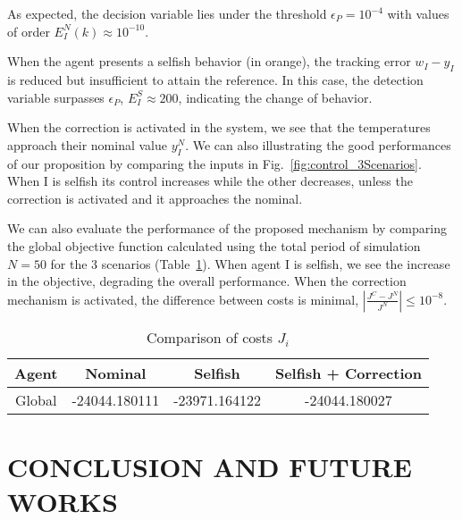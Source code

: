 \documentclass{ifacconf}  %
\begin{document}
As expected, the decision variable lies under the threshold $\epsilon_{P}=10^{-4}$ with values of order ${E_{I}^{N}(k)\approx10^{-10}}$.


When the agent presents a selfish behavior (in orange), the tracking error
${w_{I}-y_{I}}$ is reduced but insufficient to attain the reference.
In this case, the detection variable surpasses $\epsilon_{P}$,
${E_{I}^{S}\approx200}$, indicating the change of behavior.

When the correction is activated in the system, we see that the temperatures approach their nominal value $y_{I}^{N}$.
We can also illustrating the good
performances of our proposition by comparing the inputs in Fig.~\ref{fig:control_3Scenarios}. When I is selfish its control increases while the other decreases, unless the correction is activated and it approaches the nominal.

We can also evaluate the performance of the proposed mechanism by comparing the global objective function calculated using the total period of simulation ${N=50}$ for the 3 scenarios (Table~\ref{tab:costsGlobalLocal}).
When agent I is selfish, we see the increase in the objective, degrading the overall performance.
When the correction mechanism is activated, the difference between costs is minimal, $|\frac{J^{C}-J^{N}}{J^{N}}|\leq10^{-8}$.
\begin{table}[t]
  \centering
  \caption{Comparison of costs $J_{i}$}\label{tab:costsGlobalLocal}
  \begin{tabular}[t]{cccc} \toprule
    Agent  & Nominal & Selfish & Selfish + Correction\\
    \midrule
    Global & -24044.180111 &  -23971.164122 & -24044.180027\\
    \bottomrule
  \end{tabular}
\end{table}

\section{CONCLUSION AND FUTURE WORKS}\label{sec:CC}
\end{document}
